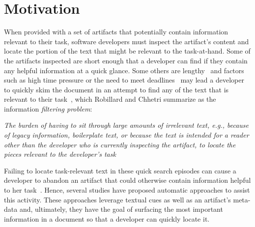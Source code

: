 \section{Motivation}
\label{cp5:motivation}


When provided with a set of artifacts that potentially contain information relevant to their task,
software developers must inspect the artifact's content and locate the portion of the text that might be relevant to the task-at-hand. 
Some of the artifacts inspected are short enough that a developer can find if they contain any helpful information at a quick glance.
Some others are lengthy~\cite{Rastkar2013t} and factors such
as high time pressure or
the need to meet deadlines~\cite{meyer2019}
may lead a developer to quickly skim the document
in an attempt to find any of the text that is relevant to their task~\cite{Starke2009},
which Robillard and Chhetri summarize as the information \textit{filtering problem}:

\smallskip
\begin{bluequote}
    \textit{The burden  of having to sit through large amounts of irrelevant text, e.g., because of legacy information, boilerplate text, or because the text is intended for a reader other than the developer who is currently inspecting the artifact, to locate the pieces relevant to the developer's task}~\cite{Robillard2015}
\end{bluequote}



Failing to locate task-relevant text in these quick search episodes can 
cause a developer to abandon an artifact that could otherwise contain information  helpful to her task~\cite{Brandt2009a, Starke2009}.
Hence, several studies have proposed automatic approaches to assist this activity. 
These approaches leverage textual cues as well as an artifact's meta-data and, ultimately, they have the goal of surfacing 
the most important information in a document so that a developer can quickly 
locate it.

